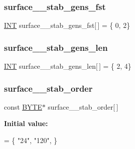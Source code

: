 \subsubsection{\texorpdfstring{surface\+\_\+\_\+stab\+\_\+gens\+\_\+fst}{surface\_11\_stab\_gens\_fst}}
{\footnotesize\ttfamily \mbox{\hyperlink{galois_8h_a09fddde158a3a20bd2dcadb609de11dc}{I\+NT}} surface\+\_\+\_\+stab\+\_\+gens\+\_\+fst\mbox{[}$\,$\mbox{]} = \{ 0, 2\}}

\mbox{\label{surface__11_8_c_a3b4166fc87da24a5ff95b02c1e434d6a}} 
\subsubsection{\texorpdfstring{surface\+\_\+\_\+stab\+\_\+gens\+\_\+len}{surface\_11\_stab\_gens\_len}}
{\footnotesize\ttfamily \mbox{\hyperlink{galois_8h_a09fddde158a3a20bd2dcadb609de11dc}{I\+NT}} surface\+\_\+\_\+stab\+\_\+gens\+\_\+len\mbox{[}$\,$\mbox{]} = \{ 2, 4\}}

\mbox{\label{surface__11_8_c_ac46b8199fcb2f000816a4177b135abbd}} 
\subsubsection{\texorpdfstring{surface\+\_\+\_\+stab\+\_\+order}{surface\_11\_stab\_order}}
{\footnotesize\ttfamily const \mbox{\hyperlink{galois_8h_ab6cc7b4aeb6ea31aba2b3fbfc83ff5e6}{B\+Y\+TE}}$\ast$ surface\+\_\+\_\+stab\+\_\+order\mbox{[}$\,$\mbox{]}}

{\bfseries Initial value\+:}
\begin{DoxyCode}
= \{
    \textcolor{stringliteral}{"24"},
    \textcolor{stringliteral}{"120"},
\}
\end{DoxyCode}
